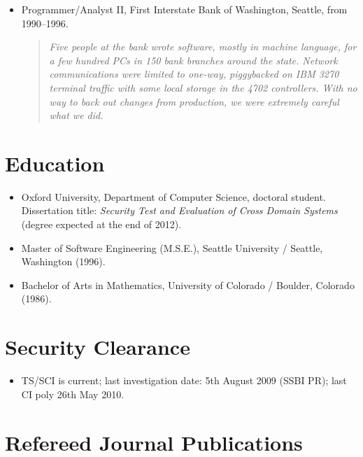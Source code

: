 \documentclass[letterpaper]{article}
\begin{document}
\begin{itemize}
	\item Programmer/Analyst II, First Interstate Bank of Washington, Seattle, from 1990--1996.

		\begin{quote}\vspace{-2mm}
			\emph{Five people at the bank wrote software, mostly in machine language, for a few
			hundred PCs in 150 bank branches around the state.  Network communications were
			limited to one-way, piggybacked on IBM 3270 terminal traffic with some local
			storage in the 4702 controllers.  With no way to back out changes from production,
			we were extremely careful what we did.}
		\end{quote}

\end{itemize}

\section*{Education} %

\begin{itemize}
    \item Oxford University, Department of Computer Science,
		doctoral student.  Dissertation title: \emph{Security Test and Evaluation
		of Cross Domain Systems} (degree expected at the end of 2012).

    \item Master of Software Engineering (M.S.E.), Seattle
		University / Seattle, Washington (1996).

    \item Bachelor of Arts in Mathematics, University of
		Colorado / Boulder, Colorado (1986).
\end{itemize}

\section*{Security Clearance}

\begin{itemize}
	\item TS/SCI is current; last investigation date: 5th August 2009 (SSBI PR);
		last CI poly 26th May 2010.
\end{itemize}

\section*{Refereed Journal Publications} %
\end{document}
